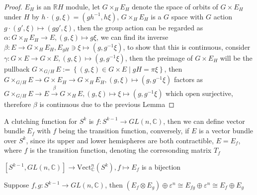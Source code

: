 \documentclass[main]{subfiles}
\begin{document}
\begin{proof}
$E_H$ is an $\mathbb RH$ module, let $G\times_H E_H$ denote the space of orbits of $G\times E_H$ under $H$ by $h\cdot(g,\xi)=(gh^{-1},h\xi)$, $G\times_H E_H$ is a $G$ space with $G$ action $g\cdot(g',\xi)\mapsto(gg',\xi)$, then the group action can be regarded as $\alpha: G\times_H E_H\to E,(g,\xi)\mapsto g\xi$, we can find its inverse $\beta:E\to G\times_H E_H,E_{gH}\ni\xi\mapsto(g,g^{-1}\xi)$, to show that this is continuous, consider $\gamma:G\times E\to G\times E,(g,\xi)\mapsto(g,g^{-1}\xi)$, then the preimage of $G\times E_H$ will be the pullback $G\times_{G/H}E:=\left\{(g,\xi)\in G\times E\middle|gH=\pi\xi\right\}$, then $G\times_{G/H}E\to G\times E_H\to G\times_H E_H,(g,\xi)\mapsto(g,g^{-1}\xi)$ factors as $G\times_{G/H}E\to E\xrightarrow{\beta} G\times_{H}E,(g,\xi)\mapsto\xi\mapsto(g,g^{-1}\xi)$ which open surjective, therefore $\beta$ is continuous due to the previous Lemma
\end{proof}

\begin{definition}
A clutching function for $S^k$ is $f:S^{k-1}\to GL(n,\mathbb C)$, then we can define vector bundle $E_f$ with $f$ being the transition function, conversely, if $E$ is a vector bundle over $S^k$, since its upper and lower hemispheres are both contractible, $E=E_f$, where $f$ is the transition function, denoting the corresonding matrix $T_f$
\end{definition}

\begin{theorem}
$[S^{k-1},GL(n,\mathbb C)]\to\mathrm{Vect}^n_{\mathbb C}(S^k), f\mapsto E_f$ is a bijection
\end{theorem}

\begin{lemma}
Suppose $f,g:S^{k-1}\to GL(n,\mathbb C)$, then $(E_{f}\otimes E_g)\oplus\varepsilon^n\cong E_{fg}\oplus\varepsilon^n\cong E_f\oplus E_g$
\end{lemma}
\end{document}
